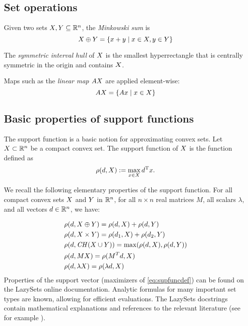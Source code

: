 \subsection{Set operations}\label{sec:setops}

Given two sets $X, Y \subseteq \mathbb{R}^n$, the \emph{Minkowski sum} is
%
\[
	X \oplus Y = \{ x + y \mid x \in X, y \in Y \}
\]

The \emph{symmetric interval hull} of $X$ is the smallest hyperrectangle that is centrally symmetric in the origin and contains $X$.

Maps such as the \emph{linear map} $A X$ are applied element-wise:
%
\[
	A X = \{ A x \mid x \in X \}
\]


\subsection{Basic properties of support functions}\label{sec:supfunc_properties}

The support function is a basic notion for approximating convex sets. Let $X \subset \mathbb{R}^n$ be a compact convex set. The support function of $X$ is the function defined as
\begin{equation}\label{eq:supfuncdef}
\rho(d, X) := \max\limits_{x \in X} d^\mathrm{T} x.
\end{equation}

We recall the following elementary properties of the support function. For all compact convex sets $X$ and $Y$ in $\mathbb{R}^n$, for all $n\times n$ real
matrices $M$, all scalars $\lambda$, and all vectors
$d \in \mathbb{R}^n$, we have:

\begin{align*}
    &\rho(d, X \oplus Y) = \rho(d, X) + \rho(d, Y) \\
    &\rho(d, X \times Y) = \rho(d_1, X) + \rho(d_2, Y) \\
    &\rho(d, \mathit{CH}(X \cup Y)) = \max(\rho(d, X), \rho(d, Y)) \\
    &\rho(d, M X) = \rho(M^T d, X) \\
    &\rho(d, \lambda X) = \rho(\lambda d, X)
\end{align*}
Properties of the support vector (maximizers of \eqref{eq:supfuncdef}) can be found on the LazySets online documentation.
%
Analytic formulas for many important set types are known, allowing for efficient evaluations.
%
The LazySets docstrings contain mathematical explanations and references to the relevant literature (see for example ).


